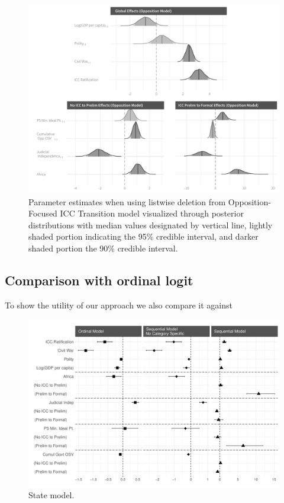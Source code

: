 \begin{figure}
    \centering
    \includegraphics[width=1\textwidth]{rebelCoefSumm_noImp.pdf}
    \caption{Parameter estimates when using listwise deletion from Opposition-Focused ICC Transition model visualized through posterior distributions with median values designated by vertical line, lightly shaded portion indicating the 95\% credible interval, and darker shaded portion the 90\% credible interval.}
    \label{fig:rebelModel_noImp}
\end{figure}

\subsection*{Comparison with ordinal logit}

To show the utility of our approach we also compare it against

\begin{figure}
    \centering
    \includegraphics[width=1\textwidth]{modCompare_state.pdf}
    \caption{State model.}
    \label{fig:stateCoefCompare}
\end{figure}

